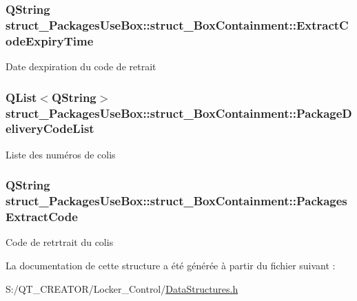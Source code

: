 \subsubsection[{Extract\+Code\+Expiry\+Time}]{\setlength{\rightskip}{0pt plus 5cm}Q\+String struct\+\_\+\+Packages\+Use\+Box\+::struct\+\_\+\+Box\+Containment\+::\+Extract\+Code\+Expiry\+Time}\label{structstruct___packages_use_box_1_1struct___box_containment_a84d48ae9098b43b8a1458a20fd868565}
Date d\textquotesingle{}expiration du code de retrait \hypertarget{structstruct___packages_use_box_1_1struct___box_containment_aa0ff418a79d449125b33c794337029f0}{}
\subsubsection[{Package\+Delivery\+Code\+List}]{\setlength{\rightskip}{0pt plus 5cm}Q\+List$<$Q\+String$>$ struct\+\_\+\+Packages\+Use\+Box\+::struct\+\_\+\+Box\+Containment\+::\+Package\+Delivery\+Code\+List}\label{structstruct___packages_use_box_1_1struct___box_containment_aa0ff418a79d449125b33c794337029f0}
Liste des numéros de colis \hypertarget{structstruct___packages_use_box_1_1struct___box_containment_a855bb0e314bbf6e36bac0876bc1dd363}{}
\subsubsection[{Packages\+Extract\+Code}]{\setlength{\rightskip}{0pt plus 5cm}Q\+String struct\+\_\+\+Packages\+Use\+Box\+::struct\+\_\+\+Box\+Containment\+::\+Packages\+Extract\+Code}\label{structstruct___packages_use_box_1_1struct___box_containment_a855bb0e314bbf6e36bac0876bc1dd363}
Code de retrtrait du colis 

La documentation de cette structure a été générée à partir du fichier suivant \+:\begin{DoxyCompactItemize}
\item 
S\+:/\+Q\+T\+\_\+\+C\+R\+E\+A\+T\+O\+R/\+Locker\+\_\+\+Control/\hyperlink{_data_structures_8h}{Data\+Structures.\+h}\end{DoxyCompactItemize}
